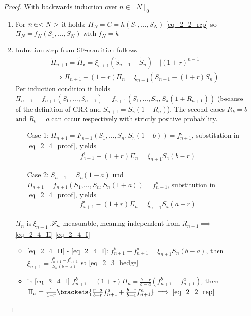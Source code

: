 \begin{proof}
	With backwards induction over  $n \in [N]_0$ 
	\begin{enumerate}
		\item For $n \in <N>$ it holds: $\Pi_N = C = h(S_1, \dots, S_N)$ \eqref{eq_2_2_rep} so $\Pi_N = f_N(S_1, \dots, S_N)$ with $f_N = h$
		\item Induction step from SF-condition follows
		\begin{align*}
			&\tilde{\Pi}_{n+1} = \tilde{\Pi}_n = \xi_{n+1}(\tilde{S}_{n+1} - \tilde{S}_n) \quad | (1+r)^{n-1}\\
			&\implies \Pi_{n+1} - (1+r)\Pi_n = \xi_{n+1}(S_{n+1} - (1+r)S_n) \tag{$\ast$}\label{eq_2_4_proof}
		\end{align*}
		Per induction condition it holds $\Pi_{n+1} = f_{n+1}(S_1, \dots, S_{n+1}) = f_{n+1}(S_1, \dots, S_n, S_n (1+R_{n+1}))$ (because of the definition of CRR and $S_{n+1} = S_n(1+R_n)$).  The second cases $R_k = b$ and $R_k = a$ can occur respectively with strictly positive probability. 
		\begin{itemize}
			\item[Case 1:] $\Pi_{n+1} = F_{n+1}(S_1, \dots, S_n, S_n(1+b)) = f^b_{n+1}$, substitution in \eqref{eq_2_4_proof}, yields
			\begin{align*}
				f^b_{n+1} - (1+r)\Pi_n = \xi_{n+1}S_n(b-r) \tag{I}\label{eq_2_4_I}
			\end{align*}
			\item[Case 2:] $S_{n+1} = S_n(1-a)$ und $\Pi_{n+1} = f_{n+1}(S_1, \dots, S_n, S_n(1+a)) = f^a_{n+1}$, substitution in \eqref{eq_2_4_proof}, yields
			\begin{align*}
				f^a_{n+1} - (1+r)\Pi_n = \xi_{n+1}S_n(a-r) \tag{II}\label{eq_2_4_II}
			\end{align*}
		\end{itemize}
		$\Pi_n$ is $\xi_{n+1}$ $\mathscr F_n$-measurable, meaning independent from $R_{n-1} \implies$ \eqref{eq_2_4_II} \eqref{eq_2_4_I}
		\begin{itemize}
			\item \eqref{eq_2_4_II} - \eqref{eq_2_4_I}: $f^b_{n+1} - f^a_{n+1} = \xi_{n+1} S_n(b-a)$, then $\xi_{n+1} = \frac{f^b_{n+1} - f^a_{n+1}}{S_n(b-a)}$ so \eqref{eq_2_3_hedge} \checkmark
			\item in \eqref{eq_2_4_I} $f^b_{n+1}-(1+r)\Pi_n = \frac{b-r}{b-a}(f^b_{n+1}-f^a_{n+1})$, then $\Pi_n = \frac{1}{1+r} \brackets{\frac{r-a}{b-r}f^a_{n+1} + \frac{b-r}{b-a}f^a_{n+1}} \implies \eqref{eq_2_2_rep}$ \checkmark
		\end{itemize}
	\end{enumerate}
\end{proof}
